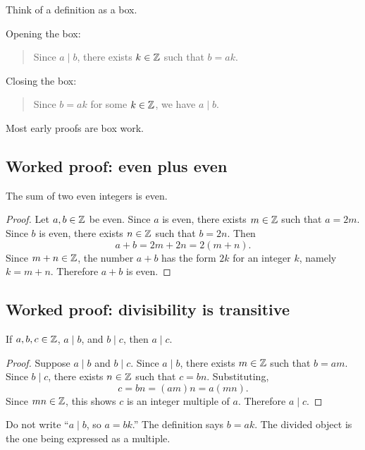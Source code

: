 \documentclass[12pt]{article}
\begin{document}
Think of a definition as a box.

Opening the box:

\begin{quote}
Since $a\mid b$, there exists $k\in\mathbb{Z}$ such that $b=ak$.
\end{quote}

Closing the box:

\begin{quote}
Since $b=ak$ for some $k\in\mathbb{Z}$, we have $a\mid b$.
\end{quote}

Most early proofs are box work.

\subsection{Worked proof: even plus even}

\begin{theorem}
The sum of two even integers is even.
\end{theorem}

\begin{proof}
Let $a,b\in\mathbb{Z}$ be even. Since $a$ is even, there exists $m\in\mathbb{Z}$ such that $a=2m$. Since $b$ is even, there exists $n\in\mathbb{Z}$ such that $b=2n$. Then
\[
a+b=2m+2n=2(m+n).
\]
Since $m+n\in\mathbb{Z}$, the number $a+b$ has the form $2k$ for an integer $k$, namely $k=m+n$. Therefore $a+b$ is even.
\end{proof}

\subsection{Worked proof: divisibility is transitive}

\begin{theorem}
If $a,b,c\in\mathbb{Z}$, $a\mid b$, and $b\mid c$, then $a\mid c$.
\end{theorem}

\begin{proof}
Suppose $a\mid b$ and $b\mid c$. Since $a\mid b$, there exists $m\in\mathbb{Z}$ such that $b=am$. Since $b\mid c$, there exists $n\in\mathbb{Z}$ such that $c=bn$. Substituting,
\[
c=bn=(am)n=a(mn).
\]
Since $mn\in\mathbb{Z}$, this shows $c$ is an integer multiple of $a$. Therefore $a\mid c$.
\end{proof}

\begin{trapbox}
Do not write ``$a\mid b$, so $a=bk$.'' The definition says $b=ak$. The divided object is the one being expressed as a multiple.
\end{trapbox}
\end{document}
